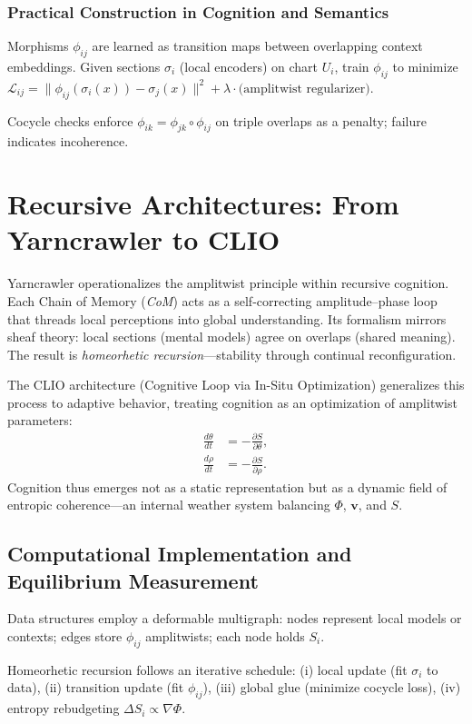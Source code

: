 \documentclass[12pt]{article}
\begin{document}
\subsubsection{Practical Construction in Cognition and Semantics}

Morphisms $\phi_{ij}$ are learned as transition maps between overlapping context embeddings. Given sections $\sigma_i$ (local encoders) on chart $U_i$, train $\phi_{ij}$ to minimize $\mathcal{L}_{ij} = \|\phi_{ij}(\sigma_i(x)) - \sigma_j(x)\|^2 + \lambda \cdot \text{(amplitwist regularizer)}$.

Cocycle checks enforce $\phi_{ik} = \phi_{jk} \circ \phi_{ij}$ on triple overlaps as a penalty; failure indicates incoherence.

\section{Recursive Architectures: From Yarncrawler to CLIO}

Yarncrawler operationalizes the amplitwist principle within recursive cognition.
Each Chain of Memory (\emph{CoM}) acts as a self-correcting amplitude--phase loop that threads local perceptions into global understanding.
Its formalism mirrors sheaf theory: local sections (mental models) agree on overlaps (shared meaning).
The result is \emph{homeorhetic recursion}---stability through continual reconfiguration.

The CLIO architecture (Cognitive Loop via In-Situ Optimization) generalizes this process to adaptive behavior, treating cognition as an optimization of amplitwist parameters:
\begin{align}
\frac{d\theta}{dt} &= -\frac{\partial S}{\partial \theta}, \\
\frac{d\rho}{dt} &= -\frac{\partial S}{\partial \rho}.
\end{align}
Cognition thus emerges not as a static representation but as a dynamic field of entropic coherence---an internal weather system balancing $\Phi$, $\mathbf{v}$, and $S$.

\subsection{Computational Implementation and Equilibrium Measurement}

Data structures employ a deformable multigraph: nodes represent local models or contexts; edges store $\phi_{ij}$ amplitwists; each node holds $S_i$.

Homeorhetic recursion follows an iterative schedule: (i) local update (fit $\sigma_i$ to data), (ii) transition update (fit $\phi_{ij}$), (iii) global glue (minimize cocycle loss), (iv) entropy rebudgeting $\Delta S_i \propto \nabla \Phi$.
\end{document}
